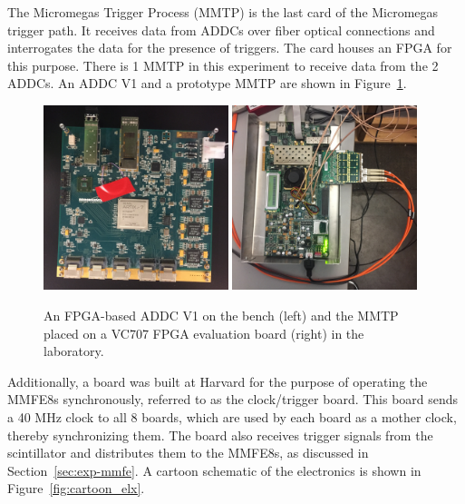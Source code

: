 The Micromegas Trigger Process (MMTP) is the last card of the Micromegas trigger path. It receives data from ADDCs over fiber optical connections and interrogates the data for the presence of triggers. The card houses an FPGA for this purpose. There is 1 MMTP in this experiment to receive data from the 2 ADDCs. An ADDC V1 and a prototype MMTP are shown in Figure~\ref{fig:cards}.

\begin{figure}[!htpb]
  \begin{center}
    \includegraphics[width=0.48\textwidth]{figures/photos/IMG_0840.JPG}
    \includegraphics[width=0.48\textwidth]{figures/photos/IMG_0836.JPG}
  \end{center}
  \vspace{-10pt}
  \caption{An FPGA-based ADDC V1 on the bench (left) and the MMTP placed on a VC707 FPGA evaluation board (right) in the laboratory.}
  \label{fig:cards}
\end{figure}

Additionally, a board was built at Harvard for the purpose of operating the MMFE8s synchronously, referred to as the clock/trigger board. This board sends a 40 MHz clock to all 8 boards, which are used by each board as a mother clock, thereby synchronizing them. The board also receives trigger signals from the scintillator and distributes them to the MMFE8s, as discussed in Section~\ref{sec:exp-mmfe}. A cartoon schematic of the electronics is shown in Figure~\ref{fig:cartoon_elx}.

